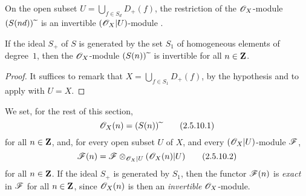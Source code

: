 \begin{corollary}[2.5.8]
\label{II.2.5.8}
On the open subset $U=\bigcup_{f\in S_d}D_+(f)$, the restriction of the $\mathscr{O}_X$-module $(S(nd)){\,\widetilde{\,}\,}$ is an invertible $(\mathscr{O}_X|U)$-module .
\end{corollary}

\begin{corollary}[2.5.9]
\label{II.2.5.9}
If the ideal $S_+$ of $S$ is generated by the set $S_1$ of homogeneous elements of degree~$1$, then the $\mathscr{O}_X$-module $(S(n)){\,\widetilde{\,}\,}$ is invertible for all $n\in\mathbf{Z}$.
\end{corollary}

\begin{proof}
It suffices to remark that $X=\bigcup_{f\in S_1}D_+(f)$, by the hypothesis  and to apply  with $U=X$.
\end{proof}

\begin{env}[2.5.10]
\label{II.2.5.10}
We set, for the rest of this section,
\[
\label{II.2.5.10.1}
  \mathscr{O}_X(n) = (S(n)){\,\widetilde{\,}\,}
\tag{2.5.10.1}
\]
for all $n\in\mathbf{Z}$, and, for every open subset $U$ of $X$, and every $(\mathscr{O}_X|U)$-module $\mathscr{F}$,
\[
\label{II.2.5.10.2}
  \mathscr{F}(n) = \mathscr{F}\otimes_{\mathscr{O}_X|U}(\mathscr{O}_X(n)|U)
\tag{2.5.10.2}
\]
for all $n\in\mathbf{Z}$.
If the ideal $S_+$ is generated by $S_1$, then the functor $\mathscr{F}(n)$ is \emph{exact} in $\mathscr{F}$ for all $n\in\mathbf{Z}$, since $\mathscr{O}_X(n)$ is then an \emph{invertible} $\mathscr{O}_X$-module.
\end{env}


